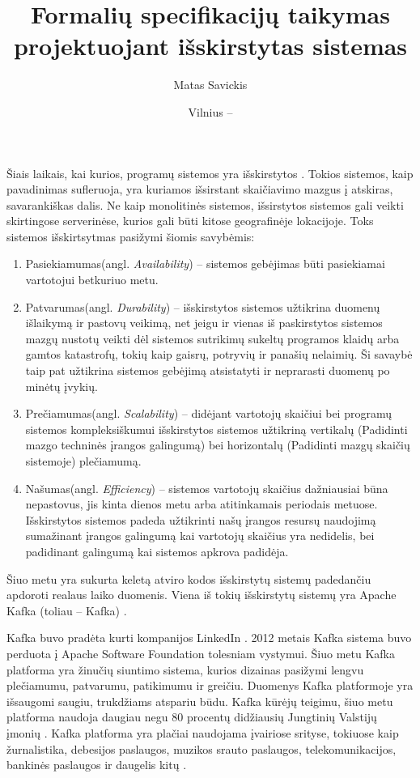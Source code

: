 \documentclass{VUMIFPSmagistrinis}
\title{Formalių specifikacijų taikymas projektuojant išskirstytas sistemas}
\author{Matas Savickis}
\date{Vilnius – \the\year}
\begin{document}
\maketitle

\tableofcontents


		Šiais laikais, kai kurios, programų sistemos yra išskirstytos \cite{mcr}. 
		Tokios sistemos, kaip pavadinimas sufleruoja, yra kuriamos išsirstant skaičiavimo mazgus į atskiras, savarankiškas dalis.
		Ne kaip monolitinės sistemos, išsirstytos sistemos gali veikti skirtingose serverinėse, kurios gali būti kitose geografinėje lokacijoje.
		Toks sistemos išskirtsytmas pasižymi šiomis savybėmis:
		\begin{enumerate}
			\item{Pasiekiamumas(angl. {\it Availability}) -- sistemos gebėjimas būti pasiekiamai vartotojui betkuriuo metu.}
			\item{Patvarumas(angl. {\it Durability}) -- išskirstytos sistemos užtikrina duomenų išlaikymą ir pastovų veikimą, net jeigu ir vienas iš paskirstytos sistemos mazgų nustotų veikti dėl sistemos sutrikimų sukeltų programos klaidų arba gamtos katastrofų, tokių kaip gaisrų, potryvių ir panašių nelaimių. Ši savaybė taip pat užtikrina sistemos gebėjimą atsistatyti ir neprarasti duomenų po minėtų įvykių.}
			\item{Prečiamumas(angl. {\it Scalability}) -- didėjant vartotojų skaičiui bei programų sistemos kompleksiškumui išskirstytos sistemos užtikriną vertikalų (Padidinti mazgo techninės įrangos galingumą) bei horizontalų (Padidinti mazgų skaičių sistemoje) plečiamumą.}
			\item{Našumas(angl. {\it Efficiency}) -- sistemos vartotojų skaičius dažniausiai būna nepastovus, jis kinta dienos metu arba atitinkamais periodais metuose. Išskirstytos sistemos padeda užtikrinti našų įrangos resursų naudojimą sumažinant įrangos galingumą kai vartotojų skaičius yra nedidelis, bei padidinant galingumą kai sistemos apkrova padidėja.}
		\end{enumerate}
		Šiuo metu yra sukurta keletą atviro kodos išskirstytų sistemų padedančiu apdoroti realaus laiko duomenis.	
		Viena iš tokių išskirstytų sistemų yra Apache Kafka (toliau -- Kafka) \cite{kfk}.


 		Kafka buvo pradėta kurti kompanijos LinkedIn \cite{kfk}.
		2012 metais Kafka sistema buvo perduota į Apache Software Foundation tolesniam vystymui.
		Šiuo metu Kafka platforma yra žinučių siuntimo sistema, kurios dizainas pasižymi lengvu plečiamumu, patvarumu, patikimumu ir greičiu.
		Duomenys Kafka platformoje yra išsaugomi saugiu, trukdžiams atspariu būdu.
		Kafka kūrėjų teigimu, šiuo metu platforma naudoja daugiau negu 80 procentų didžiausių Jungtinių Valstijų įmonių \cite{kfk}.
		Kafka platforma yra plačiai naudojama įvairiose srityse, tokiuose kaip žurnalistika, debesijos paslaugos, muzikos srauto paslaugos, telekomunikacijos, bankinės paslaugos ir daugelis kitų \cite{kfk}.
\end{document}
